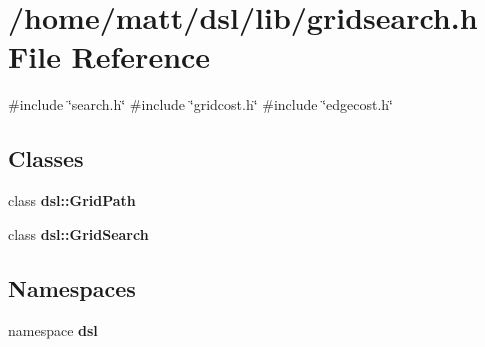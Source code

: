 \section{/home/matt/dsl/lib/gridsearch.h \-File \-Reference}
\label{gridsearch_8h}
{\ttfamily \#include \char`\"{}search.\-h\char`\"{}}\*
{\ttfamily \#include \char`\"{}gridcost.\-h\char`\"{}}\*
{\ttfamily \#include \char`\"{}edgecost.\-h\char`\"{}}\*
\subsection*{\-Classes}
\begin{DoxyCompactItemize}
\item 
class {\bf dsl\-::\-Grid\-Path}
\item 
class {\bf dsl\-::\-Grid\-Search}
\end{DoxyCompactItemize}
\subsection*{\-Namespaces}
\begin{DoxyCompactItemize}
\item 
namespace {\bf dsl}
\end{DoxyCompactItemize}
